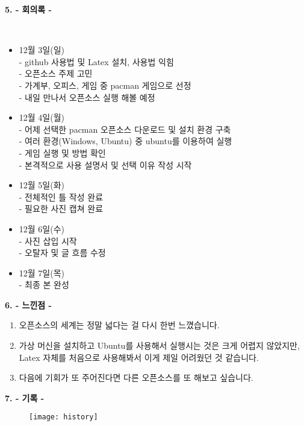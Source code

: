 \documentclass{article}
\begin{document}
\newpage
\begin{large}\textbf{5. - 회의록 -}\end{large}\\
\begin{itemize}
\item 12월 3일(일)\\
 
- github 사용법 및 Latex 설치, 사용법 익힘\\
 
- 오픈소스 주제 고민\\
 
- 가계부, 오피스, 게임 중 pacman 게임으로 선정\\
 
- 내일 만나서 오픈소스 실행 해볼 예정\\
 
\item 12월 4일(월)\\
 
- 어제 선택한 pacman 오픈소스 다운로드 및 설치 환경 구축\\
 
- 여러 환경(Windows, Ubuntu) 중 ubuntu를 이용하여 실행\\
 
- 게임 실행 및 방법 확인\\
 
- 본격적으로 사용 설명서 및 선택 이유 작성 시작\\
 
\item 12월 5일(화)\\
 
 - 전체적인 틀 작성 완료\\
 
 - 필요한 사진 캡쳐 완료\\
 
\item 12월 6일(수)\\
 
 - 사진 삽입 시작\\
 
 - 오탈자 및 글 흐름 수정\\
 
\item 12월 7일(목)\\

 - 최종 본 완성\\
\end{itemize}

\begin{large}\textbf{6. - 느낀점 -}\end{large}
\begin{enumerate}
\item 오픈소스의 세계는 정말 넓다는 걸 다시 한번 느꼈습니다.
\item 가상 머신을 설치하고 Ubuntu를 사용해서 실행시는 것은 크게 어렵지 않았지만, Latex 자체를 처음으로 사용해봐서
이게 제일 어려웠던 것 같습니다.
\item 다음에 기회가 또 주어진다면 다른 오픈소스를 또 해보고 싶습니다.
\end{enumerate}

\newpage
\begin{large}\textbf{7. - 기록 -}\end{large}
 \begin{figure}[!h]
\centering
\texttt{[image: history]}
\end{figure}
\end{document}
